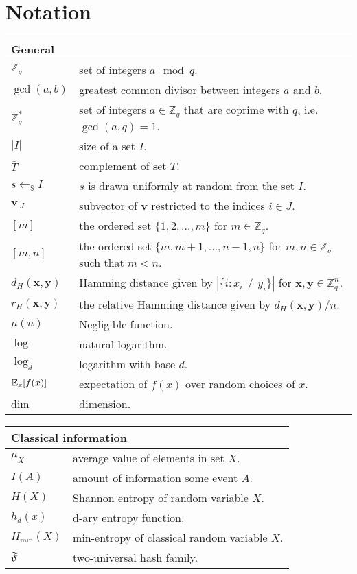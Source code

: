 \chapter*{Notation}


\newcommand{\tabstart}[1]{\noindent \begin{tabular}{p{2.95cm}p{12cm}}
    \multicolumn{2}{l}{{\bf #1}} \\ 
    \hline}

\newcommand{\tabstop}{\hline \end{tabular}}

\newcommand{\tabinter}{\vspace{1ex}}

\tabstart{General}
$\mathbb{Z}_q$ & set of integers $a \mod q$.\\
$\gcd (a,b)$ & greatest common divisor between integers $a$ and $b$.\\
$\mathbb{Z}^*_q$ & set of integers $a\in\mathbb{Z}_q$ that are coprime with $q$, i.e. $\gcd (a,q) = 1$.\\
$|I|$ & size of a set $I$.\\
$\bar{T}$ & complement of set $T$.\\
$s\leftarrow_{\$}I$ & $s$ is drawn uniformly at random from the set $I$.\\
$\bm{v}_{|J}$ & subvector of $\bm{v}$ restricted to the indices $i \in J$.\\
$[m]$ & the ordered set $\{1, 2, \ldots, m\}$ for $m\in \mathbb{Z}_q$.\\
$[m, n]$ & the ordered set $\{m, m+1, \dots, n-1, n\}$ for $m, n\in \mathbb{Z}_q$ such that $m<n$.\\
$d_H(\bm{x}, \bm{y})$ & Hamming distance given by $ |\{ i : x_i \neq y_i \}|$ for $\bm{x},\bm{y}\in\mathbb{Z}^n_q$.\\
$r_H(\bm{x}, \bm{y})$ & the relative Hamming distance given by $d_H(\bm{x}, \bm{y})/n$.\\
$\mu(n)$ & Negligible function.\\
  $\log$ & natural logarithm.\\
 $\log_d$ & logarithm with base $d$.\\
  $\operatorname*{\mathbb{E}}_{x}[f(x)]$ & expectation of $f(x)$ over random choices of $x$.\\
  dim & dimension.\\
\tabstop

\tabinter

\tabstart{Classical information}
$\mu_X$ & average value of elements in set $X$.\\
$I(A)$ & amount of information some event $A$.\\
$H(X)$ & Shannon entropy of random variable $X$.\\
$h_d(x)$ & d-ary entropy function.\\
$H_{\min}(X)$ & min-entropy of classical random variable $X$.\\
$\mathfrak{F}$ & two-universal hash family.\\
\tabstop

